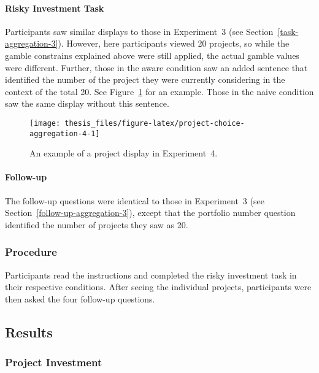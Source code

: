 \documentclass[a4paper, nobind]{templates/ociamthesis}
\theoremstyle{definition}
\theoremstyle{definition}
\theoremstyle{definition}
\theoremstyle{definition}
\theoremstyle{remark}
\begin{document}
\paragraph{Risky Investment Task}

Participants saw similar displays to those in Experiment~3 (see
Section~\ref{task-aggregation-3}). However, here participants viewed 20
projects, so while the gamble constrains explained above were still applied, the
actual gamble values were different. Further, those in the aware condition saw
an added sentence that identified the number of the project they were currently
considering in the context of the total 20. See
Figure~\ref{fig:project-choice-aggregation-4} for an example. Those in the
naive condition saw the same display without this sentence.



\begin{figure}
\texttt{[image: thesis\_files/figure-latex/project-choice-aggregation-4-1]} \caption{An example of a project display in Experiment~4.}\label{fig:project-choice-aggregation-4}
\end{figure}

\paragraph{Follow-up}

The follow-up questions were identical to those in Experiment~3 (see
Section~\ref{follow-up-aggregation-3}), except that the portfolio number
question identified the number of projects they saw as 20.

\subsubsection{Procedure}

Participants read the instructions and completed the risky investment task in
their respective conditions. After seeing the individual projects, participants
were then asked the four follow-up questions.

\subsection{Results}

\subsubsection{Project Investment}
\end{document}
